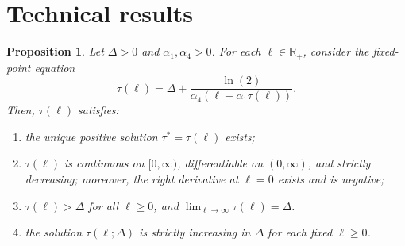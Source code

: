 \documentclass{article}
\newtheorem{proposition}{Proposition}
\begin{document}
\section{Technical results}\label{sec:technical}
\begin{proposition}\label{prop:T_fixedpoint}
    Let $\Delta>0$ and $\alpha_1,\alpha_4>0$. For each $\ell\in\mathbb{R}_+$, consider the fixed-point equation
    \begin{equation}\label{eq:T_fixedpoint}
        \tau(\ell) = \Delta+\frac{\ln(2)}{\alpha_4(\ell+\alpha_1\tau(\ell))}.
    \end{equation}
    Then, $\tau(\ell)$ satisfies:
    \begin{enumerate}
        \item[\emph{(i)}] the unique positive solution $\tau^* = \tau(\ell)$ exists;
        \item[\emph{(ii)}] $\tau(\ell)$ is continuous on $[0,\infty)$, differentiable on $(0,\infty)$, and strictly decreasing; moreover, the right derivative at $\ell=0$ exists and is negative;
        \item[\emph{(iii)}] $\tau(\ell)>\Delta$ for all $\ell\ge0$, and $\lim_{\ell\to\infty}\tau(\ell)=\Delta$.
        \item[\emph{(iv)}] the solution $\tau(\ell;\Delta)$ is strictly increasing in $\Delta$ for each fixed $\ell\ge0$.
    \end{enumerate}
\end{proposition}
\end{document}
